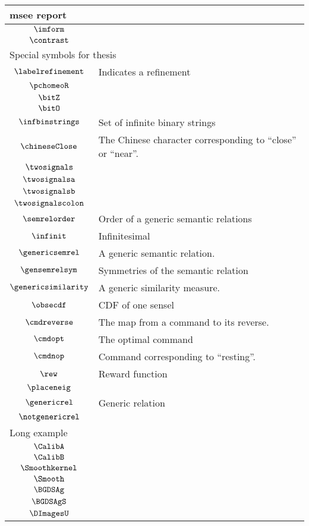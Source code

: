 \begin{longtable}{cl}
 \multicolumn{2}{l}{msee report}\\ 
 \hline
$\imform$ & \\ 
 $\contrast$ & \\ 
 \multicolumn{2}{l}{Special symbols for thesis}\\ 
 \hline
$\labelrefinement$ &  Indicates a refinement\\ 
 $\pchomeoR$ & \\ 
 $\bitZ$ & \\ 
 $\bitO$ & \\ 
 $\infbinstrings$ &  Set of infinite binary strings\\ 
 $\chineseClose$ &  The Chinese character corresponding to ``close'' or ``near''. \\ 
 $\twosignals$ & \\ 
 $\twosignalsa$ & \\ 
 $\twosignalsb$ & \\ 
 $\twosignalscolon$ & \\ 
 $\semrelorder$ &  Order of a generic semantic relations\\ 
 $\infinit$ &  Infinitesimal\\ 
 $\genericsemrel$ &  A generic semantic relation.\\ 
 $\gensemrelsym$ &  Symmetries of the semantic relation\\ 
 $\genericsimilarity$ &  A generic similarity measure.\\ 
 $\obsecdf$ &  CDF of one sensel\\ 
 $\cmdreverse$ &  The map from a command to its reverse.\\ 
 $\cmdopt$ &  The optimal command\\ 
 $\cmdnop$ &  Command corresponding to ``resting''.\\ 
 $\rew$ &  Reward function\\ 
 $\placeneig$ & \\ 
 $\genericrel$ &  Generic relation\\ 
 $\notgenericrel$ & \\ 
 \multicolumn{2}{l}{Long example}\\ 
 \hline
$\CalibA$ & \\ 
 $\CalibB$ & \\ 
 $\Smoothkernel$ & \\ 
 $\Smooth$ & \\ 
 $\BGDSAg$ & \\ 
 $\BGDSAgS$ & \\ 
 $\DImagesU$ & \\ 

\end{longtable}

